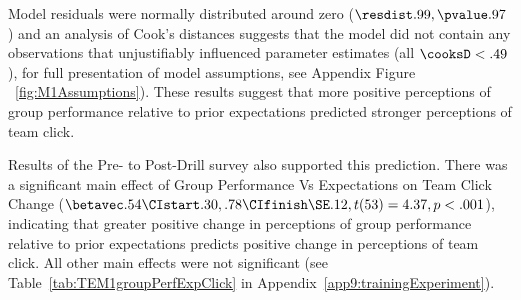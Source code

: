 Model residuals were normally distributed around zero ($\resdist .99, \pvalue .97$) and an analysis of Cook's distances suggests that the model did not contain any observations that unjustifiably influenced parameter estimates (all $\cooksD < .49$), for full presentation of model assumptions, see Appendix Figure ~\ref{fig:M1Assumptions}).  These results suggest that more positive perceptions of group performance relative to prior expectations predicted stronger perceptions of team click.


Results of the Pre- to Post-Drill survey also supported this prediction.  There was a significant main effect of Group Performance Vs Expectations on  Team Click Change ($\betavec .54 \CIstart .30, .78 \CIfinish \SE .12, t(53) = 4.37, p < .001$), indicating that greater positive change in perceptions of group performance relative to prior expectations predicts positive change in perceptions of team click.  All other main effects were not significant (see Table~\ref{tab:TEM1groupPerfExpClick} in Appendix~\ref{app9:trainingExperiment}).





